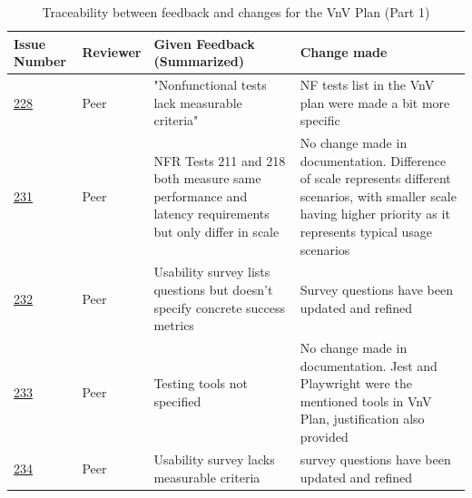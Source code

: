 \documentclass{article}
\begin{document}
\begin{table}[H]
\centering
\begin{tabularx}{\textwidth}{p{1.3cm} l X X}
\toprule
Issue Number & Reviewer & Given Feedback (Summarized) & Change made  \\
\midrule
\href{https://github.com/ritual-17/flow/issues/228}{228} & Peer & "Nonfunctional tests lack measurable criteria" & NF tests list in the
VnV plan were made a bit more specific \\
\href{https://github.com/ritual-17/flow/issues/231}{231} & Peer & NFR Tests 211 and 218 both measure same performance and latency
requirements but only differ in scale & No change made in documentation.
Difference of scale represents different scenarios, with smaller scale
having higher priority as it represents typical usage scenarios \\
\href{https://github.com/ritual-17/flow/issues/232}{232} & Peer & Usability survey lists questions but doesn't specify concrete success metrics
& Survey questions have been updated and refined \\
\href{https://github.com/ritual-17/flow/issues/233}{233} & Peer & Testing tools not specified & No change made in documentation.
Jest and Playwright were the mentioned tools in VnV Plan, justification also provided \\
\href{https://github.com/ritual-17/flow/issues/234}{234} & Peer & Usability survey lacks measurable criteria & survey questions have been
updated and refined \\
\bottomrule
\end{tabularx}
\caption{Traceability between feedback and changes for the VnV Plan (Part 1)}
\end{table}
\end{document}
